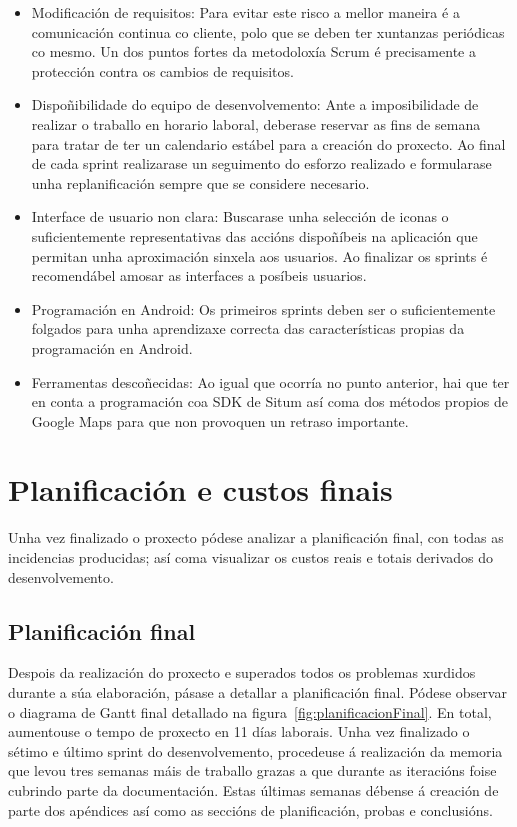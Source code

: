 \begin{itemize}
	\item Modificación de requisitos: Para evitar este risco a mellor maneira é a comunicación continua co cliente, polo que se deben ter xuntanzas periódicas co mesmo. Un dos puntos fortes da metodoloxía Scrum é precisamente a protección contra os cambios de requisitos.
	\item Dispoñibilidade do equipo de desenvolvemento: Ante a imposibilidade de realizar o traballo en horario laboral, deberase reservar as fins de semana para tratar de ter un calendario estábel para a creación do proxecto. Ao final de cada sprint realizarase un seguimento do esforzo realizado e formularase unha replanificación sempre que se considere necesario.
	\item Interface de usuario non clara: Buscarase unha selección de iconas o suficientemente representativas das accións dispoñíbeis na aplicación que permitan unha aproximación sinxela aos usuarios. Ao finalizar os sprints é recomendábel amosar as interfaces a posíbeis usuarios.
	\item Programación en Android: Os primeiros sprints deben ser o suficientemente folgados para unha aprendizaxe correcta das características propias da programación en Android.
	\item Ferramentas descoñecidas: Ao igual que ocorría no punto anterior, hai que ter en conta a programación coa SDK de Situm así coma dos métodos propios de Google Maps para que non provoquen un retraso importante.
\end{itemize}

\section{Planificación e custos finais}
Unha vez finalizado o proxecto pódese analizar a planificación final, con todas as incidencias producidas; así coma visualizar os custos reais e totais derivados do desenvolvemento.


\subsection{Planificación final}
Despois da realización do proxecto e superados todos os problemas xurdidos durante a súa elaboración, pásase a detallar a planificación final. Pódese observar o diagrama de Gantt final detallado na figura~\ref{fig:planificacionFinal}. En total, aumentouse o tempo de proxecto en 11 días laborais.
Unha vez finalizado o sétimo e último sprint do desenvolvemento, procedeuse á realización da memoria que levou tres semanas máis de traballo grazas a que durante as iteracións foise cubrindo parte da documentación. Estas últimas semanas débense á creación de parte dos apéndices así como as seccións de planificación, probas e conclusións.

